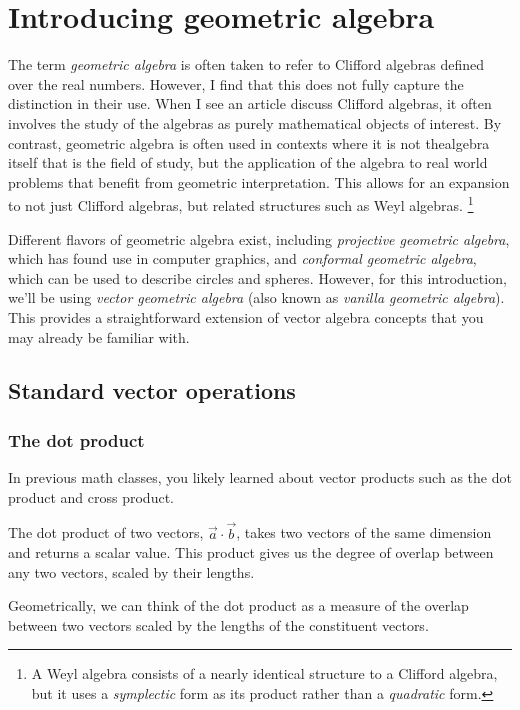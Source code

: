 \chapter{Introducing geometric algebra}

The term \textit{geometric algebra} is often taken to refer to Clifford algebras defined over the
real numbers. However, I find that this does not fully capture the distinction in their use. When I 
see an article discuss Clifford algebras, it often involves the study of the algebras as purely
mathematical objects of interest. By contrast, geometric algebra is often used  in contexts where
it is not thealgebra itself that is the field of study, but the application of the algebra to real
world problems that benefit from geometric interpretation. This allows for an expansion to not just 
Clifford algebras, but related structures such as Weyl algebras.
\footnote{A Weyl algebra consists of a nearly identical structure to a Clifford algebra, but it 
uses a \textit{symplectic} form as its product rather than a \textit{quadratic} form.}

Different flavors of geometric algebra exist, including \textit{projective geometric algebra}, 
which has found use in computer graphics, and \textit{conformal geometric algebra}, which can be
used to describe circles and spheres. However, for this introduction, we'll be using
\textit{vector geometric algebra} (also known as \textit{vanilla geometric algebra}). This provides
a straightforward extension of vector algebra concepts that you may already be familiar with.

\section{Standard vector operations}

\subsection{The dot product}
In previous math classes, you likely learned about vector products such as the dot product and 
cross product.

The dot product of two vectors, $\vec{a}\cdot\vec{b}$, takes two vectors of the same dimension and
returns a scalar value. This product gives us the degree of overlap between any two vectors, scaled
by their lengths.

Geometrically, we can think of the dot product as a measure of the overlap between two vectors
scaled by the lengths of the constituent vectors.

